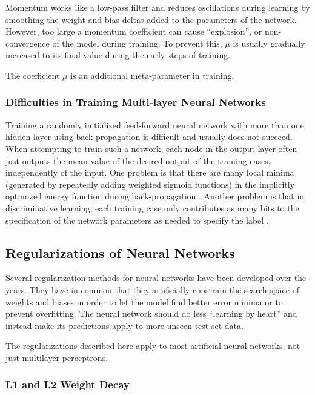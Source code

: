 Momentum works like a low-pass filter and reduces oscillations during
learning by smoothing the weight and bias deltas added to the parameters
of the network. However, too large a momentum coefficient can cause
``explosion'', or non-convergence of the model during training.
To prevent this, $\mu$ is usually gradually increased to its final
value during the early steps of training.

The coefficient $\mu$ is an additional meta-parameter in training.

\subsubsection{Difficulties in Training Multi-layer Neural Networks}

Training a randomly initialized feed-forward neural network with more
than one hidden layer using back-propagation is difficult and usually
does not succeed. When attempting to train such a network, each node
in the output layer often just outputs the mean value of the desired
output of the training cases, independently of the input. One problem
is that there are many local minima (generated by repeatedly adding
weighted sigmoid functions) in the implicitly optimized energy function
during back-propagation \cite{GoriTesi1992}. Another problem is that
in discriminative learning, each training case only contributes as
many bits to the specification of the network parameters as needed
to specify the label \cite{Hinton2010}.

\subsection{Regularizations of Neural Networks}

Several regularization methods for neural networks
have been developed over the years. They have in common that they
artificially constrain the search space of weights and biases in order
to let the model find better error minima or to prevent overfitting.
The neural network should do less ``learning by heart'' and instead
make its predictions apply to more unseen test set data.

The regularizations described here apply to most artificial neural
networks, not just multilayer perceptrons.

\subsubsection{L1 and L2 Weight Decay\label{subsec:L1-and-L2-Weight-Decay}}

